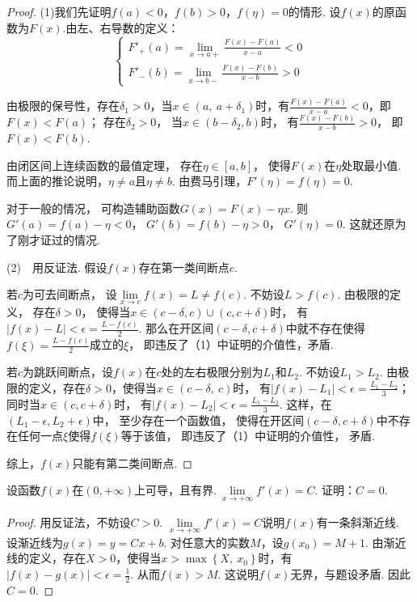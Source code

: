 \begin{proof}
(1)我们先证明$f(a)<0$，$f(b) > 0$，$f(\eta)=0$的情形.
设$f(x)$的原函数为$F(x)$.由左、右导数的定义：
\[
\begin{cases}
    F'_{+} (a) = \lim\limits_{x \to a+} \frac{F(x)-F(a)}{x-a} <0 \\
    F'_{-} (b) = \lim\limits_{x \to b-} \frac{F(x)-F(b)}{x-b} >0
\end{cases}
\]

由极限的保号性，存在$\delta_1 >0$，当$x \in ( a,~a + \delta_1)$时，有$\frac{F(x)-F(a)}{x-a}<0$，即$F(x)<F(a)$；
存在$\delta_2 >0$，
当$x \in (b-\delta_2,b)$时，
有$\frac{F(x)-F(b)}{x-b}>0$，
即$F(x)<F(b)$.

由闭区间上连续函数的最值定理，
存在$\eta \in [a,b]$，
使得$F(x)$在$\eta$处取最小值.
而上面的推论说明，$\eta \ne a$且$\eta \ne b$.
由费马引理，$F'(\eta) = f(\eta) = 0$.\par
对于一般的情况，
可构造辅助函数$G(x) = F(x) - \eta x$.
则$G'(a) = f(a) - \eta < 0$，
$G'(b) = f(b) - \eta > 0$，
$G'(\eta) =0$.
这就还原为了刚才证过的情况.

(2)~~用反证法. 假设$f(x)$存在第一类间断点$c$.\par
若$c$为可去间断点，
设$\lim\limits_{x \to c} f(x) = L \ne f(c)$.
不妨设$L>f(c)$.
由极限的定义，
存在$\delta>0$，
使得当$x \in (c-\delta,c)\cup (c,c+\delta)$时，
有$|f(x) - L|< \epsilon = \frac{L - f(c)}{2}$.
那么在开区间$(c-\delta,c+\delta)$中就不存在使得$f(\xi) = \frac{L - f(c)}{2}$成立的$\xi$，
即违反了（1）中证明的介值性，矛盾.\par
若$c$为跳跃间断点，设$f(x)$在$c$处的左右极限分别为$L_1$和$L_2$.
不妨设$L_1 > L_2$.
由极限的定义，存在$\delta>0$，使得当$x \in (c-\delta,~c)$时，
有$|f(x) - L_1| < \epsilon = \frac{L_1 - L_2}{3}$；
同时当$x \in (c,c+\delta)$时，
有$|f(x) - L_2| < \epsilon = \frac{L_1 - L_2}{3}$.
这样，在$(L_1 - \epsilon,L_2 + \epsilon)$中，
至少存在一个函数值，
使得在开区间$(c-\delta,c+\delta)$中不存在任何一点$\xi$使得$f(\xi)$等于该值，
即违反了（1）中证明的介值性，
矛盾.

综上，$f(x)$只能有第二类间断点.
\end{proof}

\begin{example}
\label{ex:ch04-48}
设函数$f(x)$在$(0,+\infty)$上可导，且有界.$~\lim\limits_{x \to +\infty} f'(x) = C$.
证明：$C = 0$.
\end{example}

\begin{proof}
用反证法，不妨设$C>0$.
$\lim\limits_{x \to +\infty} f'(x) = C$说明$f(x)$有一条斜渐近线.
设渐近线为$g(x) = y = Cx + b$.
对任意大的实数$M$，设$g(x_0) = M+1$.
由渐近线的定义，存在$X>0$，使得当$x > \max \left\{ X,~x_0 \right\}$时，有$|f(x) - g(x)| < \epsilon = \frac{1}{2}$.
从而$f(x) > M$.
这说明$f(x)$无界，与题设矛盾.
因此$C=0$.
\end{proof}

